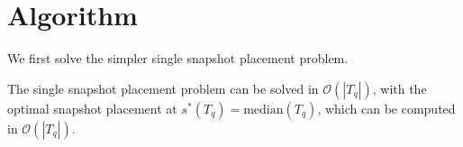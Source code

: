\section{Algorithm}

We first solve the simpler single snapshot placement problem.

\begin{theorem}
    The single snapshot placement problem can be solved in $\mathcal{O}(|T_q|)$,
    with the optimal snapshot placement at
    $ s^*(T_q) = \mathrm{median}(T_q) $,
    which can be computed in $\mathcal{O}(|T_q|)$.
\end{theorem}


